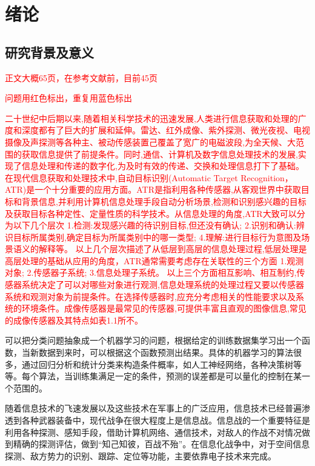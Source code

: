 \chapter{绪论}
\section{研究背景及意义}
\textcolor{red}{正文大概65页，在参考文献前，目前45页}

\textcolor{red}{问题用红色标出，重复用蓝色标出}


\textcolor{red}{二十世纪中后期以来,随着相关科学技术的迅速发展,人类进行信息获取和处理的广度和深度都有了巨大的扩展和延伸。雷达、红外成像、紫外探测、微光夜视、电视摄像及声探测等各种主、被动传感装置己覆盖了宽广的电磁波段,为全天候、大范围的获取信息提供了前提条件。同时,通信、计算机及数字信息处理技术的发展,实现了信息处理和传递的数字化,为及时有效的传递、交换和处理信息打下了基础。
在现代信息获取和处理技术中,自动目标识别(Automatic Target Recognition， ATR)是一个十分重要的应用方面。ATR是指利用各种传感器,从客观世界中获取目标和背景信息,并利用计算机信息处理手段自动分析场景,检测和识别感兴趣的目标及获取目标各种定性、定量性质的科学技术。从信息处理的角度,ATR大致可以分为以下几个层次
1.检测:发现感兴趣的待识别目标,但还没有确认;
2.识别和确认:辨识目标所属类别,确定目标为所属类别中的哪一类型;
4.理解:进行目标行为意图及场景语义的解释等。
以上几个层次描述了从低层到高层的信息处理过程,低层处理是高层处理的基础从应用的角度，ATR通常需要考虑存在关联性的三个方面
1.观测对象;
2.传感器子系统;
3.信息处理子系统。
以上三个方面相互影响、相互制约,传感器系统决定了可以对哪些对象进行观测,信息处理系统的处理过程又要以传感器系统和观测对象为前提条件。在选择传感器时,应充分考虑相关的性能要求以及系统的环境条件。成像传感器是最常见的传感器,可提供丰富且直观的图像信息,常见的成像传感器及其特点如表1.1所不。}

可以把分类问题抽象成一个机器学习的问题，根据给定的训练数据集学习出一个函数，当新数据到来时，可以根据这个函数预测出结果。具体的机器学习的算法很多，通过回归分析和统计分类来构造条件概率，如人工神经网络，各种决策树等等。每个算法，当训练集满足一定的条件，预测的误差都是可以量化的控制在某一个范围的。

随着信息技术的飞速发展以及这些技术在军事上的广泛应用，信息技术已经普遍渗透到各种武器装备中，现代战争在很大程度上是信息战。信息战的一个重要特征是利用各种探测、感知手段，借助计算机网络、通信技术，对敌人的作战不对情况做到精确的探测评估，做到“知己知彼，百战不殆”。在信息化战争中，对于空间信息探测、敌方势力的识别、跟踪、定位等功能，主要依靠电子技术来完成\cite{顾耀平2006电子战发展趋势分析, 孙德海2003国外电子战发展综述及对我国电子战研究的思考, 炜森1996综合电子战新技术新方法, 孙纪尧2014电子战}。

